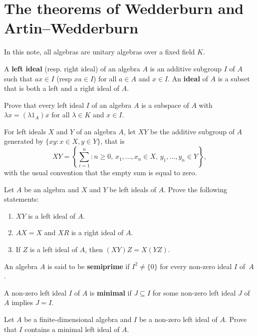 \section{The theorems of Wedderburn and Artin--Wedderburn}

In this note, all algebras are unitary algebras over a fixed field $K$. 

A \textbf{left ideal} (resp. right ideal) 
of an algebra
$A$ is an additive subgroup $I$ of $A$ such that 
$ax\in I$ (resp $xa\in I$) 
for all $a\in A$ and $x\in I$. An \textbf{ideal} of $A$ 
is a subset that is both a left and a right ideal of $A$. 

\begin{exercise}
Prove that every left ideal $I$ of an algebra 
$A$ is a subspace of $A$ with $\lambda x=(\lambda 1_A)x$ 
for all $\lambda\in K$ and $x\in I$.
\end{exercise}

For left ideals $X$ and $Y$ of 
an algebra $A$, let $XY$ be the additive subgroup of $A$ 
generated by $\{xy:x\in X,y\in Y\}$, that is 
\[
XY=\left\{\sum_{i=1}^n:n\geq0,\,x_1,\dots,x_n\in X,\,y_1,\dots,y_n\in Y\right\},
\]
with the usual convention that the empty sum is equal to zero. 
    
\begin{exercise}
    Let $A$ be an algebra and $X$ and $Y$ be left ideals of $A$. 
    Prove the following statements:
    \begin{enumerate}
        \item $XY$ is a left ideal of $A$.
        \item $AX=X$ and $XR$ is a right ideal of $A$. 
        \item If $Z$ is a left ideal of $A$, then $(XY)Z=X(YZ)$. 
    \end{enumerate}
\end{exercise}

\begin{definition}
An algebra $A$ is said to be 
\textbf{semiprime} if $I^2\ne\{0\}$ for every non-zero ideal $I$ of~$A$.	
\end{definition}

\begin{definition}
A non-zero left ideal $I$ of $A$ is \textbf{minimal} if 
$J\subseteq I$ for some non-zero 
left ideal $J$ of $A$ implies $J=I$. 
\end{definition}

\begin{exercise}
\label{xca:minimal}
    Let $A$ be a finite-dimensional algebra and $I$ be a non-zero left
    ideal of $A$. Prove that $I$ contains a minimal left ideal of $A$. 
\end{exercise}


